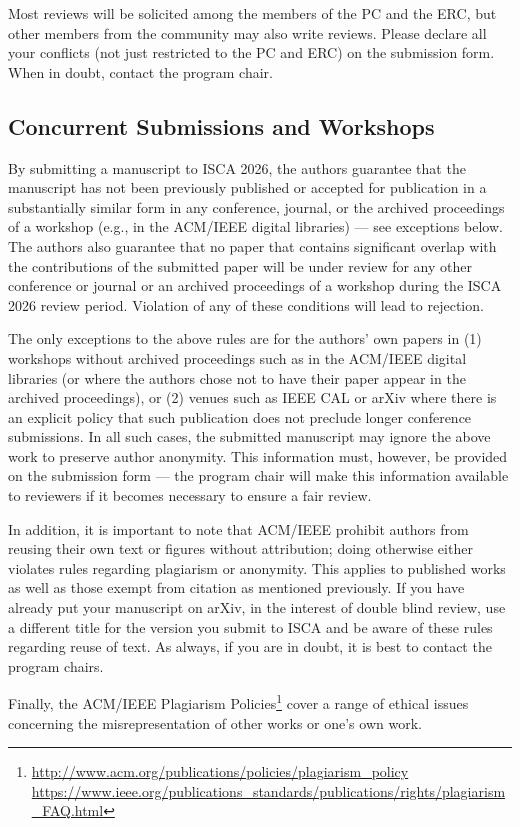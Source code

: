 \documentclass[conference]{IEEEtran}
\begin{document}
Most reviews will be solicited among the members of the PC and the ERC, but other
members from the community may also write reviews. Please declare all
your conflicts (not just restricted to the PC and ERC) on the
submission form. When in doubt, contact the program chair.


\subsection{Concurrent Submissions and Workshops}
By submitting a manuscript to ISCA 2026, the authors guarantee that
the manuscript has not been previously published or accepted for
publication in a substantially similar form in any conference,
journal, or the archived proceedings of a workshop (e.g., in the
ACM/IEEE digital libraries) --- see exceptions below. The authors also
guarantee that no paper that contains significant overlap with the
contributions of the submitted paper will be under review for any
other conference or journal or an archived proceedings of a workshop
during the ISCA 2026 review period. Violation of any of these
conditions will lead to rejection.

The only exceptions to the above rules are for the authors' own papers
in (1) workshops without archived proceedings such as in the ACM/IEEE
digital libraries (or where the authors chose not to have their paper
appear in the archived proceedings), or (2) venues such as IEEE CAL or
arXiv where there is an explicit policy that such publication does not
preclude longer conference submissions.  In all such cases, the
submitted manuscript may ignore the above work to preserve author
anonymity. This information must, however, be provided on the
submission form --- the program chair will make this information available
to reviewers if it becomes necessary to ensure a fair review.

In addition, it is important to note that ACM/IEEE prohibit authors from
reusing their own text or figures without attribution; doing otherwise either
violates rules regarding plagiarism or anonymity. This applies to published
works as well as those exempt from citation as mentioned previously. If you
have already put your manuscript on arXiv, in the interest of double blind
review, use a different title for the version you submit to ISCA and be aware
of these rules regarding reuse of text. As always, if you are in doubt, it is
best to contact the program chairs. 

Finally, the ACM/IEEE Plagiarism Policies\footnote{\url{http://www.acm.org/publications/policies/plagiarism_policy}\\
\url{https://www.ieee.org/publications_standards/publications/rights/plagiarism_FAQ.html}}
cover a range of ethical issues concerning the misrepresentation of
other works or one's own work.
\end{document}
